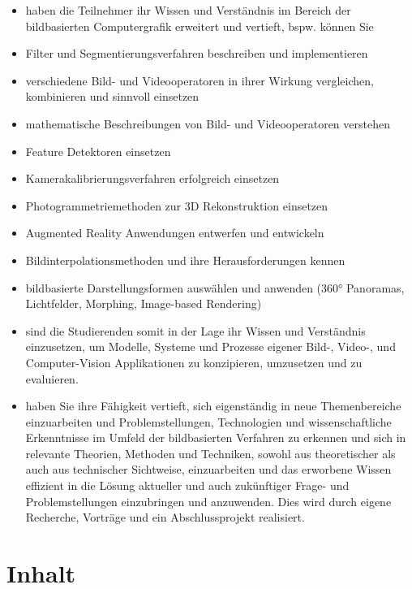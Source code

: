 \begin{itemize}
\tightlist
\item
  haben die Teilnehmer ihr Wissen und Verständnis im Bereich der
  bildbasierten Computergrafik erweitert und vertieft, bspw. können Sie
\item
  Filter und Segmentierungsverfahren beschreiben und implementieren
\item
  verschiedene Bild- und Videooperatoren in ihrer Wirkung vergleichen,
  kombinieren und sinnvoll einsetzen
\item
  mathematische Beschreibungen von Bild- und Videooperatoren verstehen
\item
  Feature Detektoren einsetzen
\item
  Kamerakalibrierungsverfahren erfolgreich einsetzen
\item
  Photogrammetriemethoden zur 3D Rekonstruktion einsetzen
\item
  Augmented Reality Anwendungen entwerfen und entwickeln
\item
  Bildinterpolationsmethoden und ihre Herausforderungen kennen
\item
  bildbasierte Darstellungsformen auswählen und anwenden (360°
  Panoramas, Lichtfelder, Morphing, Image-based Rendering)
\item
  sind die Studierenden somit in der Lage ihr Wissen und Verständnis
  einzusetzen, um Modelle, Systeme und Prozesse eigener Bild-, Video-,
  und Computer-Vision Applikationen zu konzipieren, umzusetzen und zu
  evaluieren.
\item
  haben Sie ihre Fähigkeit vertieft, sich eigenständig in neue
  Themenbereiche einzuarbeiten und Problemstellungen, Technologien und
  wissenschaftliche Erkenntnisse im Umfeld der bildbasierten Verfahren
  zu erkennen und sich in relevante Theorien, Methoden und Techniken,
  sowohl aus theoretischer als auch aus technischer Sichtweise,
  einzuarbeiten und das erworbene Wissen effizient in die Lösung
  aktueller und auch zukünftiger Frage- und Problemstellungen
  einzubringen und anzuwenden. Dies wird durch eigene Recherche,
  Vorträge und ein Abschlussprojekt realisiert.
\end{itemize}

\section*{Inhalt\label{/mi-2017/modulbeschreibungen-master/MA_VC_Modul_BildbasierteComputergrafik}}\label{inhaltpathlabelmi-2017modulbeschreibungen-mastermaux5fvcux5fmodulux5fbildbasiertecomputergrafik}

